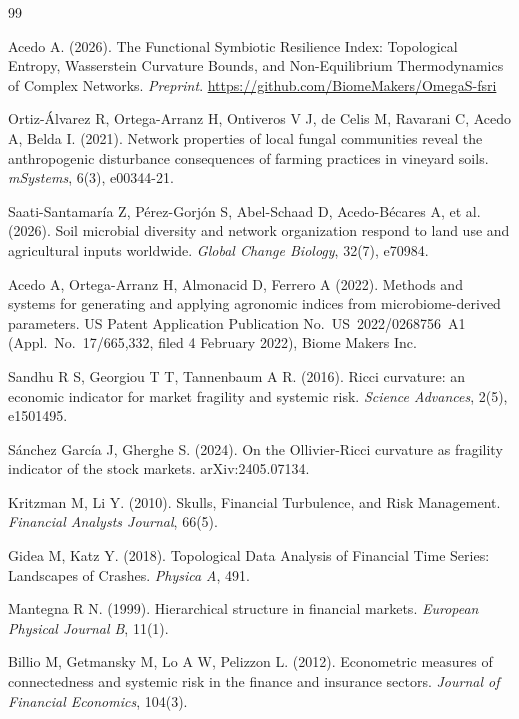 \documentclass[11pt,a4paper]{article}
\begin{document}

\begin{thebibliography}{99}

Acedo A. (2026).
The Functional Symbiotic Resilience Index: Topological Entropy, Wasserstein
Curvature Bounds, and Non-Equilibrium Thermodynamics of Complex Networks.
\emph{Preprint}.
\url{https://github.com/BiomeMakers/OmegaS-fsri}

Ortiz-\'Alvarez R, Ortega-Arranz H, Ontiveros V J, de Celis M, Ravarani C,
Acedo A, Belda I. (2021).
Network properties of local fungal communities reveal the anthropogenic
disturbance consequences of farming practices in vineyard soils.
\textit{mSystems}, 6(3), e00344-21.

Saati-Santamar\'ia Z, P\'erez-Gorj\'on S, Abel-Schaad D, Acedo-B\'ecares A,
et al. (2026).
Soil microbial diversity and network organization respond to land use and
agricultural inputs worldwide.
\textit{Global Change Biology}, 32(7), e70984.

Acedo A, Ortega-Arranz H, Almonacid D, Ferrero A (2022).
Methods and systems for generating and applying agronomic indices from
microbiome-derived parameters.
US Patent Application Publication No.\ US~2022/0268756~A1
(Appl.\ No.\ 17/665,332, filed 4 February 2022), Biome Makers Inc.

Sandhu R S, Georgiou T T, Tannenbaum A R. (2016).
Ricci curvature: an economic indicator for market fragility and systemic risk.
\textit{Science Advances}, 2(5), e1501495.

S\'anchez Garc\'ia J, Gherghe S. (2024).
On the Ollivier-Ricci curvature as fragility indicator of the stock markets.
arXiv:2405.07134.

Kritzman M, Li Y. (2010).
Skulls, Financial Turbulence, and Risk Management.
\textit{Financial Analysts Journal}, 66(5).

Gidea M, Katz Y. (2018).
Topological Data Analysis of Financial Time Series: Landscapes of Crashes.
\textit{Physica A}, 491.

Mantegna R N. (1999).
Hierarchical structure in financial markets.
\textit{European Physical Journal B}, 11(1).

Billio M, Getmansky M, Lo A W, Pelizzon L. (2012).
Econometric measures of connectedness and systemic risk in the finance
and insurance sectors.
\textit{Journal of Financial Economics}, 104(3).


\end{thebibliography}
\end{document}
